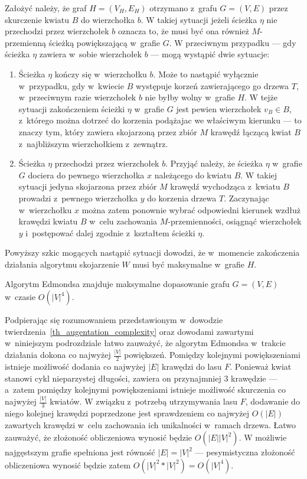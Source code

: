 {\begin{bproof}
    Założyć należy, że graf $H=(V_H, E_H)$ otrzymano z~grafu $G=(V, E)$ przez skurczenie kwiatu $B$ do wierzchołka $b$.
    W takiej sytuacji jeżeli ścieżka $\eta$ nie przechodzi przez wierzchołek $b$ oznacza to, że musi być ona również $M$-przemienną ścieżką powiększającą w~grafie $G$. W przeciwnym przypadku --- gdy ścieżka $\eta$ zawiera w~sobie wierzchołek $b$ --- mogą wystąpić dwie sytuacje:
    \begin{enumerate}
      \item Ścieżka $\eta$ kończy się w~wierzchołku $b$.
      Może to nastąpić wyłącznie w~przypadku, gdy w~kwiecie $B$ występuje korzeń zawierającego go drzewa $T$, w~przeciwnym razie wierzchołek $b$ nie byłby wolny w~grafie $H$.
      W tejże sytuacji zakończeniem ścieżki $\eta$ w~grafie $G$ jest pewien wierzchołek $v_B \in B$, z~którego można dotrzeć do korzenia podążajac we właściwym kierunku --- to znaczy tym, który zawiera skojarzoną przez zbiór $M$ krawędź łączącą kwiat $B$ z~najbliższym wierzchołkiem z~zewnątrz.
      \item Ścieżka $\eta$ przechodzi przez wierzchołek $b$.
      Przyjąć należy, że ścieżka $\eta$ w~grafie $G$ dociera do pewnego wierzchołka $x$ należącego do kwiatu $B$.
      W takiej sytuacji jedyna skojarzona przez zbiór $M$ krawędź wychodząca z~kwiatu $B$ prowadzi z~pewnego wierzchołka $y$ do korzenia drzewa $T$.
      Zaczynając w~wierzchołku $x$ można zatem ponownie wybrać odpowiedni kierunek wzdłuż krawędzi kwiatu $B$ w~celu zachowania $M$-przemienności, osiągnąć wierzchołek $y$ i~postępować dalej zgodnie z~kształtem ścieżki $\eta$.
    \end{enumerate}

    Powyższy szkic mogących nastąpić sytuacji dowodzi, że w~momencie zakończenia działania algorytmu skojarzenie $W$ musi być maksymalne w~grafie $H$.
  \end{bproof}
  \begin{theorem}
    Algorytm Edmondsa znajduje maksymalne dopasowanie grafu $G=(V, E)$ w~czasie $O(|V|^4)$.
  \end{theorem}
  \begin{bproof}
    Podpierając się rozumowaniem przedstawionym w~dowodzie twierdzenia~\ref{th_augentation_complexity} oraz dowodami zawartymi w~niniejszym podrozdziale łatwo zauważyć, że algorytm Edmondsa w~trakcie działania dokona co najwyżej $\frac{|V|}{2}$ powiększeń.
    Pomiędzy kolejnymi powiększeniami istnieje możliwość dodania co najwyżej $|E|$ krawędzi do lasu $F$.
    Ponieważ kwiat stanowi cykl nieparzystej długości, zawiera on przynajmniej 3 krawędzie --- a~zatem pomiędzy kolejnymi powiększeniami istnieje możliwość skurczenia co najwyżej $\frac{|V|}{3}$ kwiatów.
    W związku z~potrzebą utrzymywania lasu $F$, dodawanie do niego kolejnej krawędzi poprzedzone jest sprawdzeniem co najwyżej $O(|E|)$ zawartych krawędzi w~celu zachowania ich unikalności w~ramach drzewa.
    Łatwo zauważyć, że złożoność obliczeniowa wynosić będzie $O(|E||V|^2)$.
    W możliwie najgęstszym grafie spełniona jest równość $|E|=|V|^2$ --- pesymistyczna złożoność obliczeniowa wynosić będzie zatem $O(|V|^2*|V|^2)=O(|V|^4)$.
  \end{bproof}
}